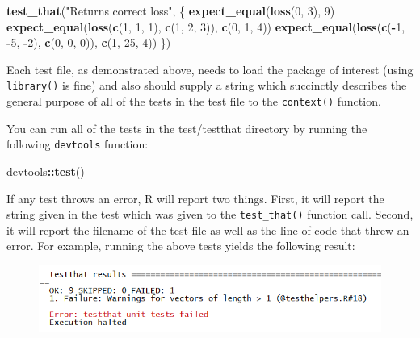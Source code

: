 \documentclass[]{book}
\newenvironment{Shaded}{\begin{snugshade}}{\end{snugshade}}
\newcommand{\KeywordTok}[1]{\textcolor[rgb]{0.13,0.29,0.53}{\textbf{#1}}}
\newcommand{\DecValTok}[1]{\textcolor[rgb]{0.00,0.00,0.81}{#1}}
\newcommand{\StringTok}[1]{\textcolor[rgb]{0.31,0.60,0.02}{#1}}
\newcommand{\OperatorTok}[1]{\textcolor[rgb]{0.81,0.36,0.00}{\textbf{#1}}}
\newcommand{\NormalTok}[1]{#1}
\begin{document}
\begin{Shaded}
\begin{Highlighting}[]
\KeywordTok{test_that}\NormalTok{(}\StringTok{"Returns correct loss"}\NormalTok{, \{}
  \KeywordTok{expect_equal}\NormalTok{(}\KeywordTok{loss}\NormalTok{(}\DecValTok{0}\NormalTok{, }\DecValTok{3}\NormalTok{), }\DecValTok{9}\NormalTok{)}
  \KeywordTok{expect_equal}\NormalTok{(}\KeywordTok{loss}\NormalTok{(}\KeywordTok{c}\NormalTok{(}\DecValTok{1}\NormalTok{, }\DecValTok{1}\NormalTok{, }\DecValTok{1}\NormalTok{), }\KeywordTok{c}\NormalTok{(}\DecValTok{1}\NormalTok{, }\DecValTok{2}\NormalTok{, }\DecValTok{3}\NormalTok{)), }\KeywordTok{c}\NormalTok{(}\DecValTok{0}\NormalTok{, }\DecValTok{1}\NormalTok{, }\DecValTok{4}\NormalTok{))}
  \KeywordTok{expect_equal}\NormalTok{(}\KeywordTok{loss}\NormalTok{(}\KeywordTok{c}\NormalTok{(}\OperatorTok{-}\DecValTok{1}\NormalTok{, }\OperatorTok{-}\DecValTok{5}\NormalTok{, }\OperatorTok{-}\DecValTok{2}\NormalTok{), }\KeywordTok{c}\NormalTok{(}\DecValTok{0}\NormalTok{, }\DecValTok{0}\NormalTok{, }\DecValTok{0}\NormalTok{)), }\KeywordTok{c}\NormalTok{(}\DecValTok{1}\NormalTok{, }\DecValTok{25}\NormalTok{, }\DecValTok{4}\NormalTok{))}
\NormalTok{\})}
\end{Highlighting}
\end{Shaded}

Each test file, as demonstrated above, needs to load the package of
interest (using \texttt{library()} is fine) and also should supply a
string which succinctly describes the general purpose of all of the
tests in the test file to the \texttt{context()} function.

You can run all of the tests in the test/testthat directory by running
the following \texttt{devtools} function:

\begin{Shaded}
\begin{Highlighting}[]
\NormalTok{devtools}\OperatorTok{::}\KeywordTok{test}\NormalTok{()}
\end{Highlighting}
\end{Shaded}

If any test throws an error, R will report two things. First, it will
report the string given in the test which was given to the
\texttt{test\_that()} function call. Second, it will report the filename
of the test file as well as the line of code that threw an error. For
example, running the above tests yields the following result:

\begin{figure}
\centering
\includegraphics{images/testSS/testthaterror1.PNG}
\caption{}
\end{figure}
\end{document}
